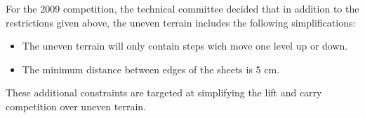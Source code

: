 \documentclass[12pt]{hurocup}
\begin{document}
\begin{decisions}
\item For the 2009 competition, the technical committee decided that
in addition to the restrictions given above, the uneven terrain
includes the following simplifications:
\begin{itemize}
\item The uneven terrain will only contain steps wich move one level
up or down.
\item The minimum distance between edges of the sheets is 5 cm.
\end{itemize}
These additional constraints are targeted at simplifying the lift and
carry competition over uneven terrain.

\end{decisions}
\end{document}
